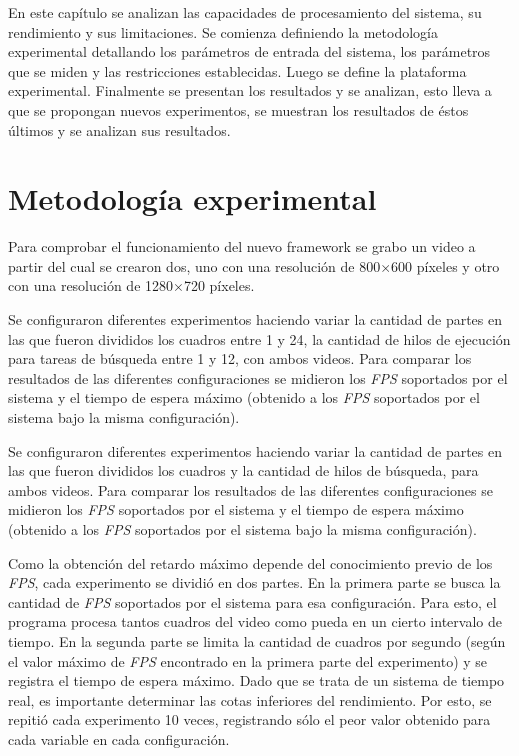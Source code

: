 
En este capítulo se analizan las capacidades de procesamiento del sistema, su
rendimiento y sus limitaciones. Se comienza definiendo la metodología
experimental detallando los parámetros de entrada del sistema, los parámetros
que se miden y las restricciones establecidas. Luego se define la plataforma
experimental. Finalmente se presentan los resultados y se analizan, esto lleva a
que se propongan nuevos experimentos, se muestran los resultados de éstos
últimos y se analizan sus resultados.

\section{Metodología experimental}

\label{metodologiaExperimental}

Para comprobar el funcionamiento del nuevo framework se grabo un video a partir
del cual se crearon dos, uno con una resolución de 800$\times$600 píxeles y otro
con una resolución de 1280$\times$720 píxeles.

Se configuraron diferentes experimentos haciendo variar la cantidad de partes en
las que fueron divididos los cuadros entre 1 y 24, la cantidad de hilos de
ejecución para tareas de búsqueda entre 1 y 12, con ambos videos. Para comparar
los resultados de las diferentes configuraciones se midieron los \emph{FPS}
soportados por el sistema y el tiempo de espera máximo (obtenido a los
\emph{FPS} soportados por el sistema bajo la misma configuración).

Se configuraron diferentes experimentos haciendo variar la cantidad de partes en
las que fueron divididos los cuadros y la cantidad de hilos de búsqueda, para
ambos videos. Para comparar los resultados de las diferentes configuraciones se
midieron los \emph{FPS} soportados por el sistema y el tiempo de espera máximo
(obtenido a los \emph{FPS} soportados por el sistema bajo la misma
configuración).

Como la obtención del retardo máximo depende del conocimiento previo de los
\emph{FPS}, cada experimento se dividió en dos partes. En la primera parte se
busca la cantidad de \emph{FPS} soportados por el sistema para esa
configuración. Para esto, el programa procesa tantos cuadros del video como
pueda en un cierto intervalo de tiempo. En la segunda parte se limita la
cantidad de cuadros por segundo (según el valor máximo de \emph{FPS} encontrado
en la primera parte del experimento) y se registra el tiempo de espera máximo.
Dado que se trata de un sistema de tiempo real, es importante determinar las
cotas inferiores del rendimiento. Por esto, se repitió cada experimento 10
veces, registrando sólo el peor valor obtenido para cada variable en cada
configuración.

